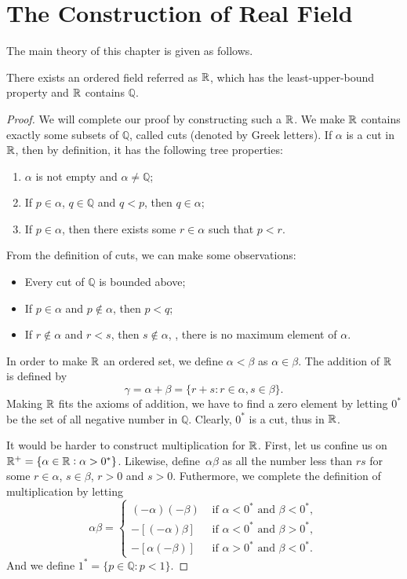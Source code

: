 \section{The Construction of Real Field}
The main theory of this chapter is given as follows.

\begin{thm}
There exists an ordered field referred as $\mathbb{R}$, which has the 
least-upper-bound property and $\mathbb{R}$ contains $\mathbb{Q}$.
\end{thm}

\begin{proof}
We will complete our proof by constructing such a $\mathbb{R}$. 
We make $\mathbb{R}$ contains exactly some subsets of $\mathbb{Q}$, 
called cuts (denoted by Greek letters). If $\alpha$ is a cut in 
$\mathbb{R}$, then by definition, it has the following tree properties:
\begin{enumerate}
\item $\alpha$ is not empty and $\alpha \neq \mathbb{Q}$; 
\item If $p \in \alpha$, $q \in \mathbb{Q}$ and $q < p$, then
$q \in \alpha$;
\item If $p \in \alpha$, then there exists some $r \in \alpha$ such that
$p < r$.
\end{enumerate}
From the definition of cuts, we can make some observations:
\begin{itemize}
\item Every cut of $\mathbb{Q}$ is bounded above;
\item If $p \in \alpha$ and $p \notin \alpha$, then $p < q$;
\item If $r \notin \alpha$ and $r < s$, then $s \notin \alpha$, \ie, 
there is no maximum element of $\alpha$.
\end{itemize}

In order to make $\mathbb{R}$ an ordered set, we define $\alpha < \beta$ 
as $\alpha \in \beta$. The addition of $\mathbb{R}$ is defined by
\begin{equation}
\gamma = \alpha + \beta = \{r + s : r \in \alpha, s \in \beta\}.
\end{equation}
Making $\mathbb{R}$ fits the axioms of addition, we have to find 
a zero element by letting $0^*$ be the set of all negative number in 
$\mathbb{Q}$. Clearly, $0^*$ is a cut, thus in $\mathbb{R}$.

It would be harder to construct multiplication for $\mathbb{R}$. First, 
let us confine us on $\mathbb{R}^+ = \{\alpha \in \mathbb{R} : 
\alpha > 0^*\}$. Likewise, define\ $\alpha \beta$ as all the number 
less than $rs$ for some $r\in \alpha$, $s \in \beta$, $r > 0$ and $s > 0$. 
Futhermore, we complete the definition of multiplication by letting 
\begin{equation}
    \alpha \beta = 
\begin{cases}
    (-\alpha)(-\beta) &\text{ if } \alpha < 0^* \text{ and } \beta < 0^*, \\
    -[(-\alpha)\beta] &\text{ if } \alpha < 0^* \text{ and } \beta > 0^*, \\
    -[\alpha(-\beta)] &\text{ if } \alpha > 0^* \text{ and } \beta < 0^*.
\end{cases}
\end{equation}
And we define $1^* = \{ p \in \mathbb{Q} : p < 1\}$.


\end{proof}
